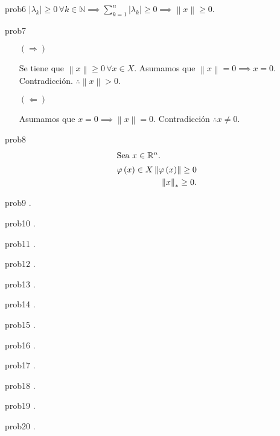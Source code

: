 \begin{sol}{prob6}
	\begin{math}
		\left|
		\lambda_{k}
		\right|\geq
		0\,\forall
		k\in\mathbb{N}\implies
		\sum_{k=1}^{n}
		\left|
		\lambda_{k}
		\right|\geq
		0\implies
		\left\|
		x
		\right\|\geq
		0
	\end{math}.
\end{sol}

\begin{sol}{prob7}
	\leavevmode
	\begin{itemize}
		\item[$\left(\Rightarrow\right)$]

		      Se tiene que $\left\|x\right\|\geq 0\,\forall x\in X$.
		      Asumamos que $\left\|x\right\|=0\implies x=0$.
		      Contradicción.
		      $\therefore \left\|x\right\|>0$.

		\item[$\left(\Leftarrow\right)$]

		      Asumamos que
		      \begin{math}
			      x=
			      0\implies
			      \left\|x\right\|=
			      0
		      \end{math}.
		      Contradicción
		      $\therefore x\neq0$.
	\end{itemize}
\end{sol}

\begin{sol}{prob8}
	\begin{align*}
		\shortintertext{Sea $x\in\mathbb{R}^{n}$.}
		\varphi\left(x\right)\in X
		\left\|\varphi\left(x\right)\right\|\geq
		0 \\
		{\left\|x\right\|}_{\ast}\geq
		0.
	\end{align*}
\end{sol}

\begin{sol}{prob9}
	.
\end{sol}

\begin{sol}{prob10}
	.
\end{sol}

\begin{sol}{prob11}
	.
\end{sol}

\begin{sol}{prob12}
	.
\end{sol}

\begin{sol}{prob13}
	.
\end{sol}

\begin{sol}{prob14}
	.
\end{sol}

\begin{sol}{prob15}
	.
\end{sol}

\begin{sol}{prob16}
	.
\end{sol}

\begin{sol}{prob17}
	.
\end{sol}

\begin{sol}{prob18}
	.
\end{sol}

\begin{sol}{prob19}
	.
\end{sol}

\begin{sol}{prob20}
	.
\end{sol}

